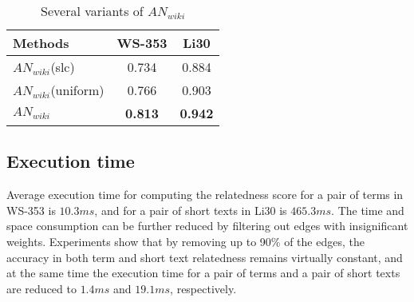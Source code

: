 \begin{table}[ht]
\centering
\caption{Several variants of $AN_{wiki}$}
\begin{tabular}{lcc}
\hline
Methods & WS-353 & Li30\\
\hline
$AN_{wiki}$(slc) & 0.734 & 0.884\\
$AN_{wiki}$(uniform) & 0.766 & 0.903\\
$AN_{wiki}$ & {\bf0.813} & {\bf0.942}\\
\hline
\end{tabular}
\label{tab:comparison1}
\end{table}



\subsection{Execution time}
\label{sec:time}
Average execution time for computing the relatedness score for a pair of
terms in WS-353 is $10.3ms$, and for a pair of short texts in Li30 is $465.3ms$.
The time and space consumption can be further reduced
by filtering out edges with insignificant weights. Experiments show that
by removing up to 90\% of the edges, the accuracy in both term and short text
relatedness remains virtually constant,
and at the same time the execution time for a pair of terms and a pair 
of short texts are reduced to $1.4ms$ and $19.1ms$, respectively.

